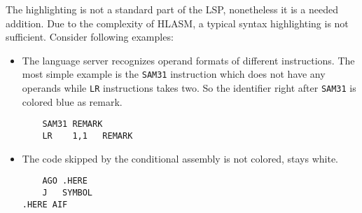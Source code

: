 The highlighting is not a standard part of the LSP, nonetheless it is a needed addition. Due to the complexity of HLASM, a typical syntax highlighting is not sufficient. Consider following examples:

\begin{itemize}
    \item The language server recognizes operand formats of different instructions. The most simple example is the \texttt{SAM31} instruction which does not have any operands while \texttt{LR} instructions takes two. So the identifier right after \texttt{SAM31} is colored blue as remark. 
    
\begin{lstlisting}
    SAM31 REMARK
    LR    1,1   REMARK
\end{lstlisting}

\item The code skipped by the conditional assembly is not colored, stays white.
\begin{lstlisting}
    AGO .HERE
    J   SYMBOL
.HERE AIF
\end{lstlisting}

\end{itemize}

